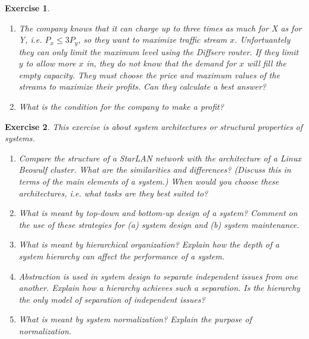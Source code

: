 \documentclass{book}
\newtheorem{exercise}{Exercise}
\begin{document}
\begin{exercise}
\begin{enumerate}
\item The company knows that it can charge up to three times as much for
X as for Y, i.e. $P_x \le 3P_y$, so they want to maximize traffic stream $x$.
Unfortuantely they can only limit the maximum level using the Diffserv router.
If they limit $y$ to allow more $x$ in, they do not know that the demand for
$x$ will fill the empty capacity. They must choose the price and maximum
values of the streams to maximize their profits. Can they calculate
a best answer?

\item What is the condition for the company to make a profit?

\end{enumerate}
\end{exercise}
\begin{solution}
\end{solution}




\begin{exercise} 
This exercise is about system architectures or structural properties
of systems.
\begin{enumerate}
\item Compare the structure of a StarLAN network with the architecture of a
Linux Beowulf cluster. What are the similarities and differences? (Discuss this in terms
of the main elements of a system.) When would you choose these architectures, i.e. what
tasks are they best suited to?

\item What is meant by top-down and bottom-up design of a system? Comment on the use of
these strategies for (a) system design and (b) system maintenance.

\item What is meant by hierarchical organization? 
Explain how the depth of a system hierarchy can affect the
performance of a system.

\item Abstraction is used in system design to separate independent issues from one another.
Explain how a hierarchy achieves such a separation. Is the hierarchy the only
model of separation of independent issues?

\item What is meant by system normalization? Explain the purpose of normalization.
\end{enumerate}
\end{exercise}
\begin{solution}
\end{solution}
\end{document}

